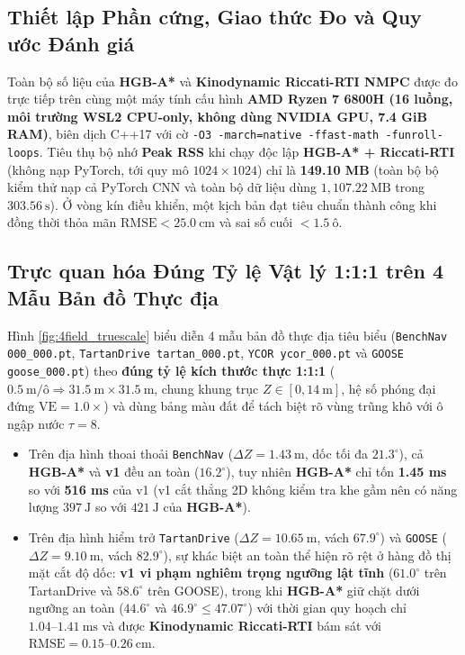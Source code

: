 \documentclass[12pt, a4paper]{article}
\begin{document}
\subsection{Thiết lập Phần cứng, Giao thức Đo và Quy ước Đánh giá}
Toàn bộ số liệu của \textbf{HGB-A*} và \textbf{Kinodynamic Riccati-RTI NMPC} được đo trực tiếp trên cùng một máy tính cấu hình \textbf{AMD Ryzen 7 6800H (16 luồng, môi trường WSL2 CPU-only, không dùng NVIDIA GPU, 7.4 GiB RAM)}, biên dịch C++17 với cờ \texttt{-O3 -march=native -ffast-math -funroll-loops}. Tiêu thụ bộ nhớ \textbf{Peak RSS} khi chạy độc lập \textbf{HGB-A* + Riccati-RTI} (không nạp PyTorch, tới quy mô $1024\times 1024$) chỉ là \textbf{149.10 MB} (toàn bộ bộ kiểm thử nạp cả PyTorch CNN và toàn bộ dữ liệu dùng $1,107.22\ \text{MB}$ trong $303.56\ \text{s}$). Ở vòng kín điều khiển, một kịch bản đạt tiêu chuẩn thành công khi đồng thời thỏa mãn $\text{RMSE} < 25.0\ \text{cm}$ và sai số cuối $< 1.5\ \text{ô}$.

\subsection{Trực quan hóa Đúng Tỷ lệ Vật lý 1:1:1 trên 4 Mẫu Bản đồ Thực địa}
Hình \ref{fig:4field_truescale} biểu diễn 4 mẫu bản đồ thực địa tiêu biểu (\texttt{BenchNav 000\_000.pt}, \texttt{TartanDrive tartan\_000.pt}, \texttt{YCOR ycor\_000.pt} và \texttt{GOOSE goose\_000.pt}) theo \textbf{đúng tỷ lệ kích thước thực 1:1:1} ($0.5\ \text{m/ô} \Rightarrow 31.5\ \text{m} \times 31.5\ \text{m}$, chung khung trục $Z \in [0, 14\ \text{m}]$, hệ số phóng đại đứng $\text{VE} = 1.0\times$) và dùng bảng màu đất để tách biệt rõ vùng trũng khô với ô ngập nước $\tau=8$.
\begin{itemize}
    \item Trên địa hình thoai thoải \texttt{BenchNav} ($\Delta Z = 1.43\ \text{m}$, dốc tối đa $21.3^\circ$), cả \textbf{HGB-A*} và \textbf{v1} đều an toàn ($16.2^\circ$), tuy nhiên \textbf{HGB-A*} chỉ tốn \textbf{1.45 ms} so với \textbf{516 ms} của v1 (v1 cắt thẳng 2D không kiểm tra khe gầm nên có năng lượng $397\ \text{J}$ so với $421\ \text{J}$ của \textbf{HGB-A*}).
    \item Trên địa hình hiểm trở \texttt{TartanDrive} ($\Delta Z = 10.65\ \text{m}$, vách $67.9^\circ$) và \texttt{GOOSE} ($\Delta Z = 9.10\ \text{m}$, vách $82.9^\circ$), sự khác biệt an toàn thể hiện rõ rệt ở hàng đồ thị mặt cắt độ dốc: \textbf{v1 vi phạm nghiêm trọng ngưỡng lật tĩnh} ($61.0^\circ$ trên TartanDrive và $58.6^\circ$ trên GOOSE), trong khi \textbf{HGB-A*} giữ chặt dưới ngưỡng an toàn ($44.6^\circ$ và $46.9^\circ \le 47.07^\circ$) với thời gian quy hoạch chỉ $1.04\text{--}1.41\ \text{ms}$ và được \textbf{Kinodynamic Riccati-RTI} bám sát với $\text{RMSE} = 0.15\text{--}0.26\ \text{cm}$.
\end{itemize}
\end{document}
